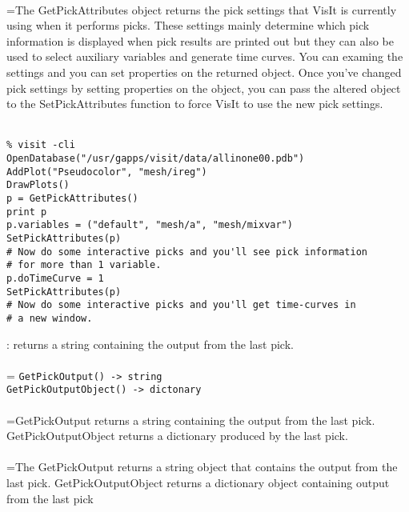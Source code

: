 \documentclass[10pt,a4paper]{report}
\begin{document}
 \\ 
\hangindent=\parindent The GetPickAttributes object returns the pick settings that VisIt is currently using when it performs picks. These settings mainly determine which pick information is displayed when pick results are printed out but they can also be used to select auxiliary variables and generate time curves. You can examing the settings and you can set properties on the returned object. Once you've changed pick settings by setting properties on the object, you can pass the altered object to the SetPickAttributes function to force VisIt to use the new pick settings. \\[-3mm] 

\\[-6mm]
\begin{verbatim}% visit -cli
OpenDatabase("/usr/gapps/visit/data/allinone00.pdb")
AddPlot("Pseudocolor", "mesh/ireg")
DrawPlots()
p = GetPickAttributes()
print p
p.variables = ("default", "mesh/a", "mesh/mixvar")
SetPickAttributes(p)
# Now do some interactive picks and you'll see pick information
# for more than 1 variable.
p.doTimeCurve = 1
SetPickAttributes(p)
# Now do some interactive picks and you'll get time-curves in 
# a new window.
\end{verbatim}
\newpage


{}
: returns a string containing the output from the last pick.\\[-3mm]

 \\ 
\hangindent=\parindent 
\verb!GetPickOutput() -> string!\\ 
\verb!GetPickOutputObject() -> dictonary!\\ [-3mm]

 \\ 
\hangindent=\parindent GetPickOutput returns a string containing the output from the last pick. GetPickOutputObject returns a dictionary produced by the last pick. \\[-3mm] 

 \\ 
\hangindent=\parindent The GetPickOutput returns a string object that contains the output from the last pick. GetPickOutputObject returns a dictionary object containing output from the  last pick \\[-3mm] 
\end{document}
